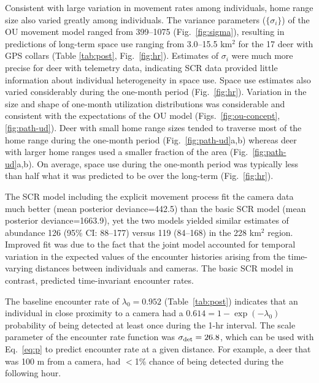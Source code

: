 \documentclass[12pt]{article}
\begin{document}
Consistent with large variation in movement rates 
among individuals, home range size also varied greatly among
individuals. The variance parameters ($\{\sigma_i\}$) of the OU
movement model ranged from 399--1075 (Fig.~\ref{fig:sigma}), resulting in
predictions of long-term space use ranging from 3.0--15.5 km$^2$ for
the 17 deer with GPS collars (Table \ref{tab:post},
Fig.~\ref{fig:hr}). Estimates of $\sigma_i$ were much more precise for
deer with telemetry data, indicating SCR data provided little
information about individual heterogeneity in space use. Space use
estimates also varied considerably during the one-month period
(Fig.~\ref{fig:hr}). Variation in the size and shape of one-month
utilization distributions was considerable and consistent with
the expectations of the OU model
(Figs.~\ref{fig:ou-concept}, \ref{fig:path-ud}). Deer with small home
range sizes tended to traverse most of the home range during the
one-month period (Fig.~\ref{fig:path-ud}a,b) whereas deer with larger
home ranges used a smaller fraction of the area (Fig.~\ref{fig:path-ud}a,b).
On average, space use during the one-month period was typically less
than half what it was predicted to be over the long-term (Fig.~\ref{fig:hr}). 

The SCR model including the explicit movement process fit the camera data
much better (mean posterior deviance=442.5) than the basic SCR model
(mean posterior deviance=1663.9), yet the two models yielded similar
estimates of abundance 126 (95\% CI:  88--177) versus 119 (84--168) in the
228 km$^2$ region. Improved fit was due to the fact that the joint
model accounted for temporal variation in the expected values of 
the encounter histories arising from the time-varying distances between
individuals and cameras. The basic SCR model in contrast, predicted 
time-invariant encounter rates. 

The baseline encounter rate of $\lambda_0=0.952$ (Table~\ref{tab:post}) 
indicates that an individual in close proximity to a camera had a
$0.614 = 1-\exp(-\lambda_0)$ probability of being detected at least
once during the 1-hr interval. The scale
parameter of the encounter rate function was $\sigma_{\rm
  det}=26.8$, which can be used with Eq.~\ref{eq:p} to predict
encounter rate at a given distance. For example, a deer that was 100 m
from a camera, had $<$1\% chance of being detected during the
following hour. 
\end{document}
